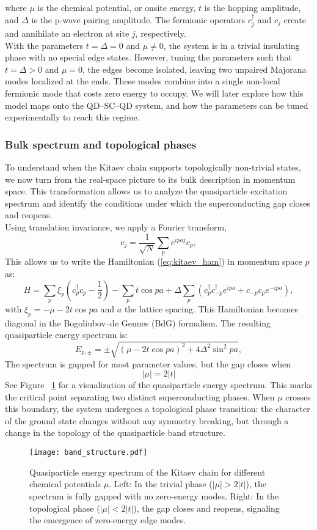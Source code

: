 \documentclass[11pt, letterpaper, titlepage]{article}
\begin{document}
where $μ$ is the chemical potential, or onsite energy, $t$ is the hopping amplitude, and $Δ$ is the p-wave pairing amplitude. The fermionic operators $c_j^\dagger$ and $c_j$ create and annihilate an electron at site $j$, respectively.\\
With the parameters $t=Δ=0$ and $μ ≠ 0$, the system is in a trivial insulating phase with no special edge states. However, tuning the parameters such that $t = Δ > 0$ and $μ = 0$, the edges become isolated, leaving two unpaired Majorana modes localized at the ends. These modes combine into a single non-local fermionic mode that costs zero energy to occupy. We will later explore how this model maps onto the QD–SC–QD system, and how the parameters can be tuned experimentally to reach this regime. 


\subsubsection{Bulk spectrum and topological phases}
To understand when the Kitaev chain supports topologically non-trivial states, we now turn from the real-space picture to its bulk description in momentum space. This transformation allows us to analyze the quasiparticle excitation spectrum and identify the conditions under which the superconducting gap closes and reopens.\\
Using translation invariance, we apply a Fourier transform,
$$
c_j = \frac{1}{\sqrt{N}} \sum_p e^{ipaj} c_p,
$$
This allows us to write the Hamiltonian (\ref{eq:kitaev_ham}) in momentum space $p$ as:
\begin{equation}
H = ∑_{ p}^{} ξ_p\left(c_p^{†} c_p - \frac{1}{2}\right) - ∑_{p}^{} t \cos p a + Δ ∑_{p}^{}\left(c_p^{†} c_{-p}^{†} e^{ipa} + c_{-p} c_p e^{-ipa}\right), 
\end{equation}
with $ξ_p = -μ - 2t \cos pa$ and $a$ the lattice spacing. This Hamiltonian becomes diagonal in the Bogoliubov–de Gennes (BdG) formalism. The resulting quasiparticle energy spectrum is:
\begin{equation}
  E_{p,\pm} = \pm \sqrt{(μ - 2t \cos{pa})^2 + 4Δ^2 \sin^2{pa}},
\end{equation}
The spectrum is gapped for most parameter values, but the gap closes when
$$
|μ| = 2|t|
$$
See Figure ~\ref{fig:kitaev_bands} for a visualization of the quasiparticle energy spectrum. This marks the critical point separating two distinct superconducting phases. When $μ$ crosses this boundary, the system undergoes a topological phase transition: the character of the ground state changes without any symmetry breaking, but through a change in the topology of the quasiparticle band structure.\\
\begin{figure}
  \texttt{[image: band\_structure.pdf]}
  \caption{Quasiparticle energy spectrum of the Kitaev chain for different chemical potentials $μ$. Left: In the trivial phase ($|μ| > 2|t|$), the spectrum is fully gapped with no zero-energy modes. Right: In the topological phase ($|μ| < 2|t|$), the gap closes and reopens, signaling the emergence of zero-energy edge modes.}
  \label{fig:kitaev_bands}
\end{figure}
\end{document}
